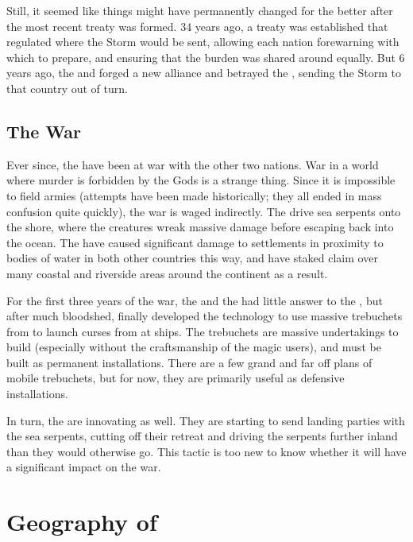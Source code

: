 \documentclass[blue]{GL2020}
\begin{document}
Still, it seemed like things might have permanently changed for the better after the most recent treaty was formed. 34 years ago, a treaty was established that regulated where the Storm would be sent, allowing each nation forewarning with which to prepare, and ensuring that the burden was shared around equally. But 6 years ago, the \pFarm{} and \pTech{} forged a new alliance and betrayed the \pShip{}, sending the Storm to that country out of turn.

\subsection*{The War}
Ever since, the \pShip{} have been at war with the other two nations. War in a world where murder is forbidden by the Gods is a strange thing. Since it is impossible to field armies (attempts have been made historically; they all ended in mass confusion quite quickly), the war is waged indirectly. The \pShip{} drive sea serpents onto the shore, where the creatures wreak massive damage before escaping back into the ocean. The \pShip{} have caused significant damage to settlements in proximity to bodies of water in both other countries this way, and have staked claim over many coastal and riverside areas around the continent as a result.

For the first three years of the war, the \pFarm{} and the \pTech{} had little answer to the \pShippies{}, but after much bloodshed, finally developed the technology to use massive trebuchets from \pTech{} to launch curses from \pFarm{} at \pShip{} ships. The trebuchets are massive undertakings to build (especially without the craftsmanship of the \pShip{} magic users), and must be built as permanent installations. There are a few grand and far off plans of mobile trebuchets, but for now, they are primarily useful as defensive installations.

In turn, the \pShip{} are innovating as well. They are starting to send landing parties with the sea serpents, cutting off their retreat and driving the serpents further inland than they would otherwise go. This tactic is too new to know whether it will have a significant impact on the war.

\section*{Geography of \pEarth{}}
\end{document}
